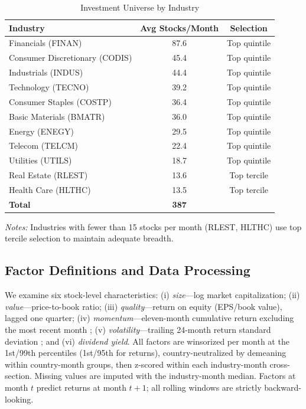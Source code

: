 \documentclass[12pt]{article}
\begin{document}
\begin{table}[H]
\centering
\caption{Investment Universe by Industry}
\label{tab:universe}
\small
\begin{tabular}{lcc}
\toprule
\textbf{Industry} & \textbf{Avg Stocks/Month} & \textbf{Selection} \\
\midrule
Financials (FINAN)            & 87.6 & Top quintile \\
Consumer Discretionary (CODIS)& 45.4 & Top quintile \\
Industrials (INDUS)           & 44.4 & Top quintile \\
Technology (TECNO)            & 39.2 & Top quintile \\
Consumer Staples (COSTP)      & 36.4 & Top quintile \\
Basic Materials (BMATR)       & 36.0 & Top quintile \\
Energy (ENEGY)                & 29.5 & Top quintile \\
Telecom (TELCM)               & 22.4 & Top quintile \\
Utilities (UTILS)             & 18.7 & Top quintile \\
Real Estate (RLEST)           & 13.6 & Top tercile \\
Health Care (HLTHC)           & 13.5 & Top tercile \\
\midrule
\textbf{Total}                & \textbf{387} & \\
\bottomrule
\end{tabular}
\begin{minipage}{0.92\textwidth}
\vspace{0.3em}
\footnotesize
\textit{Notes:} Industries with fewer than 15 stocks per month (RLEST, HLTHC) use top tercile selection to maintain adequate breadth.
\end{minipage}
\end{table}

\subsection{Factor Definitions and Data Processing}

We examine six stock-level characteristics: (i) \textit{size}---log market capitalization; (ii) \textit{value}---price-to-book ratio; (iii) \textit{quality}---return on equity (EPS/book value), lagged one quarter; (iv) \textit{momentum}---eleven-month cumulative return excluding the most recent month \citep{jegadeeshtitman1993}; (v) \textit{volatility}---trailing 24-month return standard deviation \citep{ang2006}; and (vi) \textit{dividend yield}. All factors are winsorized per month at the 1st/99th percentiles (1st/95th for returns), country-neutralized by demeaning within country-month groups, then z-scored within each industry-month cross-section. Missing values are imputed with the industry-month median. Factors at month $t$ predict returns at month $t+1$; all rolling windows are strictly backward-looking.
\end{document}
